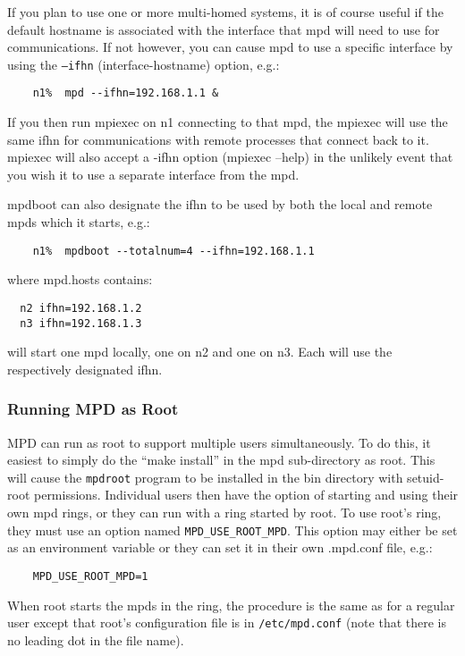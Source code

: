 \documentclass[dvipdfm,11pt]{article}
\begin{document}
If you plan to use one or more multi-homed systems, it is of course useful if
the default hostname is associated with the interface that mpd will need
to use for communications.  If not however, you can cause mpd to use a
specific interface by using the \texttt{--ifhn} (interface-hostname) option, e.g.:
\begin{verbatim}
    n1%  mpd --ifhn=192.168.1.1 &
\end{verbatim}

If you then run mpiexec on n1 connecting to that mpd, the mpiexec will
use the same ifhn for communications with remote processes that connect
back to it.  mpiexec will also accept a -ifhn option (mpiexec --help)
in the unlikely event that you wish it to use a separate interface from
the mpd.

mpdboot can also designate the ifhn to be used by both the local and remote
mpds which it starts, e.g.:
\begin{verbatim}
    n1%  mpdboot --totalnum=4 --ifhn=192.168.1.1 
\end{verbatim}
where mpd.hosts contains:
\begin{verbatim}
  n2 ifhn=192.168.1.2
  n3 ifhn=192.168.1.3
\end{verbatim}
will start one mpd locally, one on n2 and one on n3.  Each will use the
respectively designated ifhn.


\subsubsection{Running MPD as Root}
\label{sec:mpd-root}

MPD can run as root to support multiple users simultaneously.  To do this,
it easiest to simply do the ``make install'' in the mpd sub-directory as
root.  This will cause the \texttt{mpdroot} program to be installed in
the bin directory with setuid-root permissions.  Individual users then
have the option of starting and using their own mpd rings, or they can run
with a ring started by root.  To use root's ring, they must use an option
named \texttt{MPD\_USE\_ROOT\_MPD}.  This option may either be set as an environment
variable or they can set it in their own .mpd.conf file, e.g.:
\begin{verbatim}
    MPD_USE_ROOT_MPD=1
\end{verbatim}
When root starts the mpds in the ring, the procedure is the same as for a regular
user except that root's configuration file is in \texttt{/etc/mpd.conf} (note that
there is no leading dot in the file name).
\end{document}
